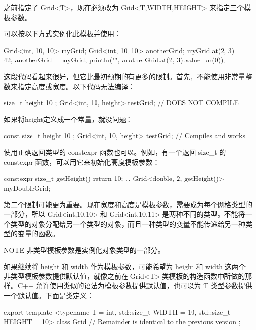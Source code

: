 之前指定了 Grid<T>，现在必须改为 Grid<T,WIDTH,HEIGHT> 来指定三个模板参数。

可以按以下方式实例化此模板并使用：

\begin{cpp}
Grid<int, 10, 10> myGrid;
Grid<int, 10, 10> anotherGrid;
myGrid.at(2, 3) = 42;
anotherGrid = myGrid;
println("{}", anotherGrid.at(2, 3).value_or(0));
\end{cpp}

这段代码看起来很好，但它比最初预期的有更多的限制。首先，不能使用非常量整数来指定高度或宽度。以下代码无法编译：

\begin{cpp}
size_t height { 10 };
Grid<int, 10, height> testGrid; // DOES NOT COMPILE
\end{cpp}

如果将height定义成一个常量，就没问题：

\begin{cpp}
const size_t height { 10 };
Grid<int, 10, height> testGrid; // Compiles and works
\end{cpp}

使用正确返回类型的 constexpr 函数也可以。例如，有一个返回 size\_t 的 constexpr 函数，可以用它来初始化高度模板参数：

\begin{cpp}
constexpr size_t getHeight() { return 10; }
...
Grid<double, 2, getHeight()> myDoubleGrid;
\end{cpp}

第二个限制可能更为重要。现在宽度和高度是模板参数，需要成为每个网格类型的一部分，所以 Grid<int,10,10> 和 Grid<int,10,11> 是两种不同的类型。不能将一个类型的对象分配给另一个类型的对象，而且一种类型的变量不能传递给另一种类型的变量的函数。

\begin{myNotic}{NOTE}
非类型模板参数是实例化对象类型的一部分。
\end{myNotic}


如果继续将 height 和 width 作为模板参数，可能希望为 height 和 width 这两个非类型模板参数提供默认值，就像之前在 Grid<T> 类模板的构造函数中所做的那样。C++ 允许使用类似的语法为模板参数提供默认值，也可以为 T 类型参数提供一个默认值。下面是类定义：

\begin{cpp}
export template <typename T = int, std::size_t WIDTH = 10, std::size_t HEIGHT = 10>
class Grid
{
    // Remainder is identical to the previous version
};
\end{cpp}

